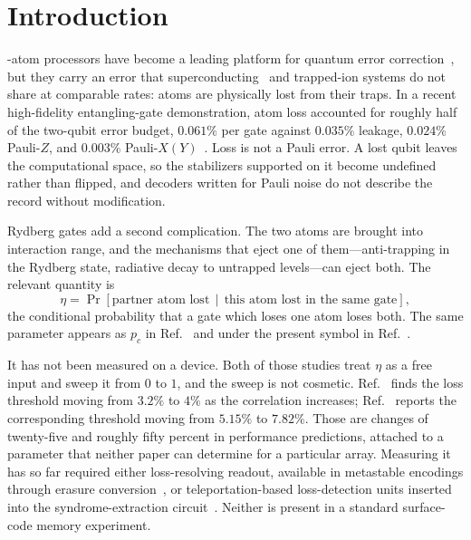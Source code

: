 \documentclass{ieeeaccess}
\begin{document}
\titlepgskip=-15pt
\maketitle


\section{Introduction}
\label{sec:introduction}

-atom processors have become a leading platform for quantum
error correction~\cite{bluvstein2024logicalprocessor}, but they carry an error
that superconducting~\cite{acharya2023scalingsurfacecode,acharya2024belowthreshold}
and trapped-ion systems do not share at comparable rates: atoms are physically
lost from their traps. In a recent high-fidelity entangling-gate demonstration,
atom loss accounted for roughly half of the two-qubit error budget,
$0.061\%$ per gate against $0.035\%$ leakage, $0.024\%$ Pauli-$Z$, and
$0.003\%$ Pauli-$X(Y)$~\cite{evered2026highfidelitygates}. Loss is not a Pauli
error. A lost qubit leaves the computational space, so the stabilizers supported
on it become undefined rather than flipped, and decoders written for Pauli noise
do not describe the record without modification.

Rydberg gates add a second complication. The two atoms are brought into
interaction range, and the mechanisms that eject one of them---anti-trapping in
the Rydberg state, radiative decay to untrapped levels---can eject both. The
relevant quantity is
\begin{equation*}
  \eta = \Pr\!\left[\text{partner atom lost} \,\middle|\, \text{this atom lost in the same gate}\right],
\end{equation*}
the conditional probability that a gate which loses one atom loses both. The
same parameter appears as $p_c$ in Ref.~\cite{perrin2026correlatedloss} and
under the present symbol in Ref.~\cite{liu2026optimaldistanceatomloss}.

It has not been measured on a device. Both of those studies treat $\eta$ as a
free input and sweep it from $0$ to $1$, and the sweep is not cosmetic.
Ref.~\cite{perrin2026correlatedloss} finds the loss threshold moving from
$3.2\%$ to $4\%$ as the correlation increases;
Ref.~\cite{liu2026optimaldistanceatomloss} reports the corresponding threshold
moving from $5.15\%$ to $7.82\%$. Those are changes of twenty-five and roughly fifty percent in performance
predictions, attached to a parameter that neither paper can determine for a
particular array. Measuring it has so far required either loss-resolving
readout, available in metastable encodings through erasure
conversion~\cite{wu2022erasureconversion,ma2023midcircuiterasure}, or
teleportation-based loss-detection units inserted into the syndrome-extraction
circuit~\cite{perrin2026correlatedloss}. Neither is present in a standard
surface-code memory experiment.
\end{document}
